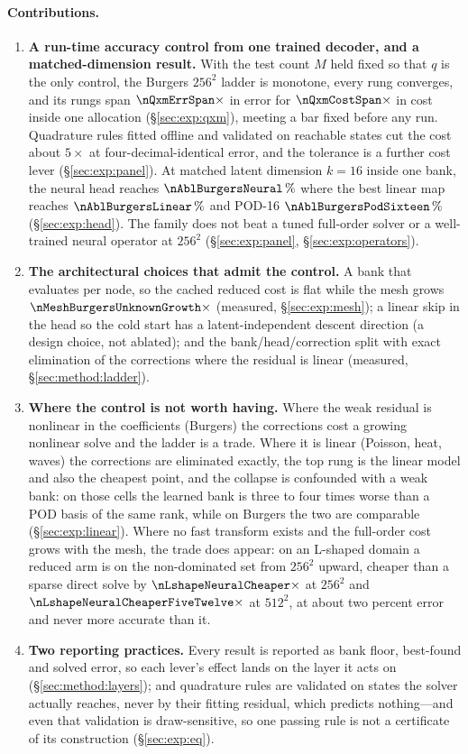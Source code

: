 \paragraph{Contributions.}
\begin{enumerate}
\item \textbf{A run-time accuracy control from one trained decoder, and a
  matched-dimension result.} With the test count $M$ held fixed so that $q$ is
  the only control, the Burgers $256^2$ ladder is monotone, every rung
  converges, and its rungs span $\nQxmErrSpan\times$ in error for
  $\nQxmCostSpan\times$ in cost inside one allocation (\S\ref{sec:exp:qxm}),
  meeting a bar fixed before any run. Quadrature rules fitted offline and
  validated on reachable states cut the cost about $5\times$ at
  four-decimal-identical error, and the tolerance is a
  further cost lever (\S\ref{sec:exp:panel}). At matched latent dimension
  $k=16$ inside one bank, the neural head reaches $\nAblBurgersNeural\,\%$
  where the best linear map reaches $\nAblBurgersLinear\,\%$ and POD-16
  $\nAblBurgersPodSixteen\,\%$ (\S\ref{sec:exp:head}). The family does not beat
  a tuned full-order solver or a well-trained neural operator at $256^2$
  (\S\ref{sec:exp:panel}, \S\ref{sec:exp:operators}).
\item \textbf{The architectural choices that admit the control.} A bank that
  evaluates per node, so the cached reduced cost is flat while the mesh grows
  $\nMeshBurgersUnknownGrowth\times$ (measured, \S\ref{sec:exp:mesh}); a linear
  skip in the head so the cold start has a latent-independent descent direction
  (a design choice, not ablated); and the bank/head/correction split with exact
  elimination of the corrections where the residual is linear (measured,
  \S\ref{sec:method:ladder}).
\item \textbf{Where the control is not worth having.} Where the weak residual
  is nonlinear in the coefficients (Burgers) the corrections cost a growing
  nonlinear solve and the ladder is a trade. Where it is linear (Poisson, heat,
  waves) the corrections are eliminated exactly, the top rung is the linear
  model and also the cheapest point, and the collapse is confounded with a weak
  bank: on those cells the learned bank is three to four times worse than a POD
  basis of the same rank, while on Burgers the two are comparable
  (\S\ref{sec:exp:linear}). Where no fast transform exists and the full-order
  cost grows with the mesh, the trade does appear: on an L-shaped domain a
  reduced arm is on the non-dominated set from $256^2$ upward, cheaper than a
  sparse direct solve by $\nLshapeNeuralCheaper\times$ at $256^2$ and
  $\nLshapeNeuralCheaperFiveTwelve\times$ at $512^2$, at about two percent
  error and never more accurate than it.
\item \textbf{Two reporting practices.} Every result is reported as bank floor,
  best-found and solved error, so each lever's effect lands on the layer it acts
  on (\S\ref{sec:method:layers}); and quadrature rules are validated on states
  the solver actually reaches, never by their fitting residual, which predicts
  nothing---and even that validation is draw-sensitive, so one passing rule is
  not a certificate of its construction (\S\ref{sec:exp:eq}).
\end{enumerate}
